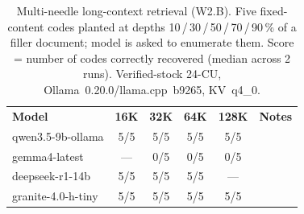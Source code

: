 \begin{table}[t]
\caption{Multi-needle long-context retrieval (W2.B).  Five fixed-content
codes planted at depths 10\,/\,30\,/\,50\,/\,70\,/\,90\,\% of a filler
document; model is asked to enumerate them.  Score = number of codes
correctly recovered (median across 2 runs).  Verified-stock 24-CU,
Ollama~0.20.0/llama.cpp~b9265, KV~q4\_0.}\label{tab:multineedle}
\centering
\scriptsize
\begin{tabular}{@{}lccccc@{}}
\toprule
\textbf{Model} & \textbf{16K} & \textbf{32K} & \textbf{64K} & \textbf{128K} & \textbf{Notes} \\
\otoprule
qwen3.5-9b-ollama & 5/5 & 5/5 & 5/5 & 5/5 &  \\
gemma4-latest & --- & 0/5 & 0/5 & 0/5 &  \\
deepseek-r1-14b & 5/5 & 5/5 & 5/5 & --- &  \\
granite-4.0-h-tiny & 5/5 & 5/5 & 5/5 & 5/5 &  \\
\bottomrule
\end{tabular}
\end{table}
